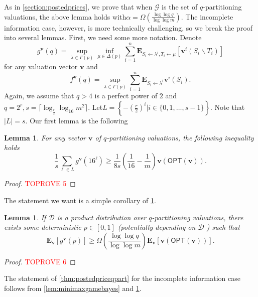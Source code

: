 \documentclass[11pt]{article}%
\newtheorem{lemma}[theorem]{Lemma}
\numberwithin{theorem}{subsection}
\newcommand{\boldv}{\mathbf{v}}
\newcommand{\opt}{\mathsf{OPT}}
\newcommand{\expect}{\mathbf{E}}
\begin{document}
\noindent
As in \cref{section:postedprices}, we prove that when $\mathcal{G}$ is the set of $q$-partitioning valuations, the above lemma holds with\linebreak $\alpha = \Omega\left(\frac{\log \log q}{\log \log m}\right).$ The incomplete information case, however, is more technically challenging, so we break the proof into several lemmas. First, we need some more notation. Denote
$$
g^\boldv(q) = 
\sup_{\lambda \in \Gamma(p)}
\inf_{\mu \in \Delta(p)}
\sum_{i = 1}^n 
\expect_{S_i\longleftarrow \lambda^i, T_i \longleftarrow \mu}[\boldv^i(S_i\backslash T_i)]
$$
for any valuation vector $\boldv$ and
$$
f^\boldv(q) = 
\sup_{\lambda \in \Gamma(p)}
\sum_{i = 1}^n 
\expect_{S_i\longleftarrow \lambda^i}\boldv^i(S_i).
$$
Again, we assume that $q>4$ is a perfect power of $2$ and $q = 2^r,s = \lceil\log_{\frac{r}{2}}\log_{16} m^2\rceil.$
Let\linebreak $\displaystyle L = \left\{ {- \left(\frac{r}{2}\right)^i}|
i \in \{0,1,\ldots, s-1\}\right\}
.$ Note that $|L| = s .$ Our first lemma is the following 

\begin{lemma}
\label{lem:postedpriceswithoutexpectation}
For any vector $\boldv$ of $q$-partitioning valuations, the following inequality holds
$$
\frac{1}{s}\sum_{\ell \in L}
g^\boldv(16^\ell)\ge 
\frac{1}{8s}
\left(\frac{1}{16} - \frac{1}{m}\right)
\boldv(\opt(\boldv)).
$$
\end{lemma}
\begin{proof}\textcolor{red}{TOPROVE 5}\end{proof}

\noindent
The statement we want is a simple corollary of \cref{lem:postedpriceswithoutexpectation}. 

\begin{lemma}
\label{lem:bayesianpostedprice}
If $\mathcal{D}$ is a product distribution over $q$-partitioning valuations, there exists some deterministic $p\in [0,1]$ (potentially 
depending on $\mathcal{D}$
) such that 
$$
\expect_\boldv\left[
g^\boldv(p)
\right] \ge 
\Omega\left(\frac{\log \log q}{\log \log m}\right)
\expect_\boldv[\boldv(\opt(\boldv))].
$$
\end{lemma}
\begin{proof}\textcolor{red}{TOPROVE 6}\end{proof}

\noindent
The statement of 
\cref{thm:postedpriceqpart} for the incomplete information case follows from
\cref{lem:minimaxgamebayes} and\linebreak 
\cref{lem:bayesianpostedprice}.
\end{document}
